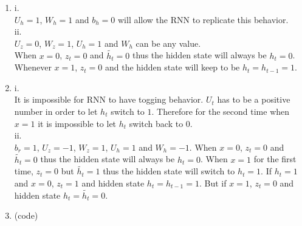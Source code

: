 \documentclass[10pt]{article}
\begin{document}
\begin{enumerate}[label=(\alph*)]
\item
i.\\
$U_h = 1$, $W_h = 1$ and $b_h = 0$ will allow the RNN to replicate this behavior.\\

ii.\\
$U_z = 0$, $W_z = 1$, $U_h = 1$ and $W_h$ can be any value.\\
When $x=0$, $z_t = 0$ and $\tilde{h_t} = 0$ thus the hidden state will always be $h_t = 0$.
Whenever $x=1$, $z_t = 0$ and the hidden state will keep to be $h_t = h_{t-1} = 1$.

\item
i.\\
It is impossible for RNN to have togging behavior.
$U_t$ has to be a positive number in order to let $h_t$ switch to $1$.
Therefore for the second time when $x = 1$ it is impossible to let $h_t$ switch back to $0$.\\

ii.\\
$b_r = 1$, $U_z = -1$, $W_z = 1$, $U_h = 1$ and $W_h = -1$.
When $x=0$, $z_t = 0$ and $\tilde{h_t} = 0$ thus the hidden state will always be $h_t = 0$.
When $x=1$ for the first time, $z_t = 0$ but $\tilde{h_t} = 1$ thus the hidden state will switch to $h_t = 1$.
If $h_t=1$ and $x=0$, $z_t = 1$ and hidden state $h_t = h_{t-1} = 1$.
But if $x=1$, $z_t = 0$ and hidden state $h_t = \tilde{h_t} = 0$.

\item
(code)

\end{enumerate}
\end{document}
